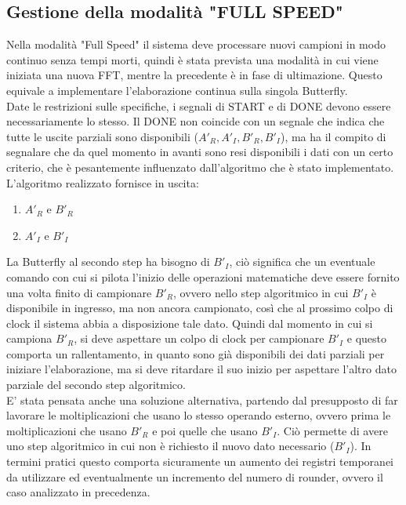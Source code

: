 \documentclass[a4paper, titlepage]{article}
\begin{document}
\subsection{Gestione della modalità "FULL SPEED"}
Nella modalità "Full Speed" il sistema deve processare nuovi campioni in modo continuo senza tempi morti, quindi è stata prevista una modalità in cui viene iniziata una nuova FFT, mentre la precedente è in fase di ultimazione. Questo equivale a implementare l'elaborazione continua sulla singola Butterfly.\\
Date le restrizioni sulle specifiche, i segnali di START e di DONE devono essere necessariamente lo stesso. Il DONE non coincide con un segnale che indica che tutte le uscite parziali sono disponibili ($A'_R,A'_I,B'_R,B'_I$), ma ha il compito di segnalare che da quel momento in avanti sono resi disponibili i dati con un certo criterio, che è pesantemente influenzato dall'algoritmo che è stato implementato.\\  
L'algoritmo realizzato fornisce in uscita:
\begin{enumerate}
\item $A'_R$ e $B'_R$
\item $A'_I$ e $B'_I$
\end{enumerate}
La Butterfly al secondo step ha bisogno di $B'_I$, ciò significa che un eventuale comando con cui si pilota l'inizio delle operazioni matematiche deve essere fornito una volta finito di campionare $B'_R$, ovvero nello step algoritmico in cui $B'_I$ è disponibile in ingresso, ma non ancora campionato, così che al prossimo colpo di clock il sistema abbia a disposizione tale dato. Quindi dal momento in cui si campiona $B'_R$, si deve aspettare un colpo di clock per campionare  $B'_I$ e questo comporta un rallentamento, in quanto sono già disponibili dei dati parziali per iniziare l'elaborazione, ma si deve ritardare il suo inizio per aspettare l'altro dato parziale del secondo step algoritmico.\\
E' stata pensata anche una soluzione alternativa, partendo dal presupposto di far lavorare le moltiplicazioni che usano lo stesso operando esterno, ovvero prima le moltiplicazioni che usano $B'_R$ e poi quelle che usano $B'_I$. Ciò permette di avere uno step algoritmico in cui non è richiesto il nuovo dato necessario ($B'_I$). In termini pratici questo comporta sicuramente un aumento dei registri temporanei da utilizzare  ed eventualmente un incremento del numero di rounder, ovvero il caso analizzato in precedenza.\\
\end{document}
